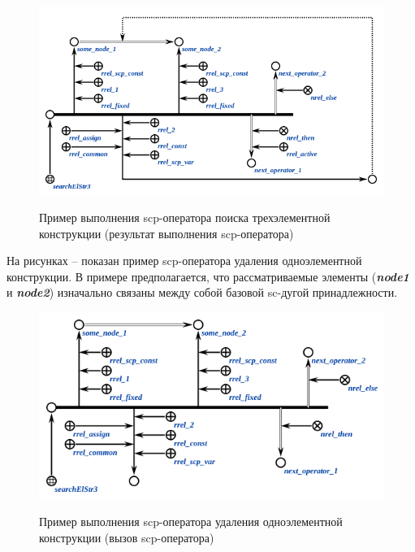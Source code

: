 \begin{figure}[H]
	\centering
	\caption{Пример выполнения scp-оператора поиска трехэлементной конструкции (результат выполнения scp-оператора)}
	\includegraphics[scale=0.8]{images/part3/chapter_situation_management/searchElStr3_faf_2.png}
	\label{fig:searchElStr3_faf_2}
\end{figure}

На рисунках \textit{} -- \textit{} показан пример scp-оператора удаления одноэлементной конструкции. В примере предполагается, что рассматриваемые элементы (\textbf{\textit{node1}} и \textbf{\textit{node2}}) изначально связаны между собой базовой sc-дугой принадлежности.

\begin{figure}[H]
	\centering
	\caption{Пример выполнения scp-оператора удаления одноэлементной конструкции (вызов scp-оператора)}
	\includegraphics[scale=0.8]{images/part3/chapter_situation_management/searchElStr3_faf.png}
	\label{fig:erase_edge}
\end{figure}

